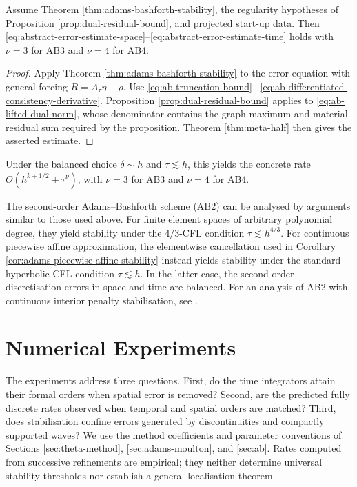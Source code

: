 \documentclass[11pt]{article}
\begin{document}
\begin{cor}
\label{cor:adams-bashforth-error}
Assume Theorem \ref{thm:adams-bashforth-stability}, the regularity hypotheses
of Proposition \ref{prop:dual-residual-bound}, and projected start-up data.
Then
\eqref{eq:abstract-error-estimate-space}--\eqref{eq:abstract-error-estimate-time}
holds with \(\nu=3\) for AB3 and \(\nu=4\) for AB4.
\end{cor}
\begin{proof}
Apply Theorem \ref{thm:adams-bashforth-stability} to the error equation with
general forcing
\(R=A_{\tau}\eta-\rho\). Use \eqref{eq:ab-truncation-bound}--
\eqref{eq:ab-differentiated-consistency-derivative}. Proposition
\ref{prop:dual-residual-bound} applies to
\eqref{eq:ab-lifted-dual-norm}, whose denominator contains the graph maximum
and material-residual sum required by the proposition. Theorem
\ref{thm:meta-half} then gives the asserted estimate.
\end{proof}
Under the balanced choice \(\delta\sim h\) and \(\tau\lesssim h\), this yields
the concrete rate \(O(h^{k+1/2}+\tau^\nu)\), with \(\nu=3\) for AB3 and \(\nu=4\)
for AB4.

\begin{rem}
\label{rem:adams-bashforth-two}
The second-order Adams--Bashforth scheme (AB2) can be analysed by arguments
similar to those used above. For finite element spaces of arbitrary polynomial
degree, they yield stability under the \(4/3\)-CFL condition
\(\tau\lesssim h^{4/3}\). For continuous piecewise affine approximation, the
elementwise cancellation used in Corollary
\ref{cor:adams-piecewise-affine-stability} instead yields stability under the
standard hyperbolic CFL condition \(\tau\lesssim h\). In the latter case, the
second-order discretisation errors in space and time are balanced. For an
analysis of AB2 with continuous interior penalty stabilisation, see
\cite{BG22}.
\end{rem}


\section{Numerical Experiments}
\label{sec:numerical-experiments}
The experiments address three questions. First, do the time integrators attain
their formal orders when spatial error is removed? Second, are the predicted
fully discrete rates observed when temporal and spatial orders are matched?
Third, does stabilisation confine errors generated by discontinuities and
compactly supported waves? We use the method coefficients and parameter
conventions of Sections \ref{sec:theta-method}, \ref{sec:adams-moulton}, and
\ref{sec:ab}. Rates computed from successive refinements are empirical; they
neither determine universal stability thresholds nor establish a general
localisation theorem.
\end{document}
